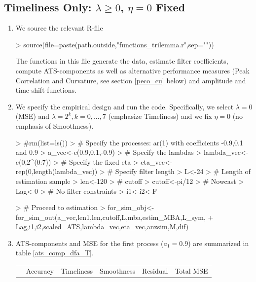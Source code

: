 \documentclass[a4paper]{book}
\begin{document}
\subsection{Timeliness Only: $\lambda\geq0$, $\eta=0$ Fixed}

\begin{enumerate}
\item We source the relevant R-file 
\begin{Schunk}
\begin{Sinput}
> source(file=paste(path.outside,"functions_trilemma.r",sep=""))
\end{Sinput}
\end{Schunk}
The functions in this file generate the data, estimate filter coefficients, compute  ATS-components as well as alternative performance measures (Peak Correlation and Curvature, see section \ref{peco_cu} below) and amplitude and time-shift-functions. 
\item We specify the empirical design and run the code. Specifically, we select $\lambda=0$ (MSE) and $\lambda=2^k, k=0,...,7$ (emphasize Timeliness) and we fix $\eta=0$ (no emphasis of Smoothness).
\begin{Schunk}
\begin{Sinput}
> #rm(list=ls())
> # Specify the processes: ar(1) with coefficients -0.9,0.1 and 0.9
> a_vec<-c(0.9,0.1,-0.9)
> # Specify the lambdas
> lambda_vec<-c(0,2^(0:7))
> # Specify the fixed eta
> eta_vec<-rep(0,length(lambda_vec))
> # Specify filter length
> L<-24
> # Length of estimation sample
> len<-120
> # cutoff
> cutoff<-pi/12
> # Nowcast
> Lag<-0
> # No filter constraints
> i1<-i2<-F
\end{Sinput}
\end{Schunk}
\begin{Schunk}
\begin{Sinput}
> # Proceed to estimation
> for_sim_obj<-for_sim_out(a_vec,len1,len,cutoff,L,mba,estim_MBA,L_sym,
+               Lag,i1,i2,scaled_ATS,lambda_vec,eta_vec,anzsim,M,dif)
\end{Sinput}
\end{Schunk}
\item ATS-components and MSE for the first process ($a_1=0.9$) are summarized in table \ref{ats_comp_dfa_T}.\\
\begin{table}[ht]
\centering
\begin{tabular}{rrrrrr}
  \hline
 & Accuracy & Timeliness & Smoothness & Residual & Total MSE \\ 

\end{tabular}
\end{table}
\end{enumerate}
\end{document}
